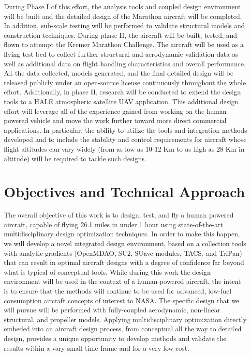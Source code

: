 \documentclass[]{aiaa-tc}
\begin{document}
    During Phase I of this effort, the analysis tools and coupled design environment will be built and 
    the detailed design of the Marathon aircraft will be completed. In addition, sub-scale testing will be 
    performed to validate structural models and construction techniques. During phase II, the aircraft will be built, 
    tested, and flown to attempt the Kremer Marathon Challenge. The aircraft will be used as a flying 
    test bed to collect further structural and aerodynamic validation data as well as additional data on 
    flight handling characteristics and overall performance. All the data collected, 
    models generated, and the final detailed design will be released publicly under an open-source license
    continuously throughout the whole effort. Additionally, in phase II, research will be conducted to extend the design tools to 
    a HALE atmospheric satellite UAV application. This additional design effort will leverage all of the experience 
    gained from working on the human powered vehicle and move the work further toward more direct commercial applications.
    In particular, the ability to utilize the tools and integration methods developed and to include the stability and
    control requirements for aircraft whose flight altitudes can vary widely (from as low as 10-12 Km to as high as 28 Km
    in altitude) will be required to tackle such designs.  


  \section{Objectives and Technical Approach}

    The overall objective of this work is to design, test, and fly a human powered aircraft, 
    capable of flying 26.1 miles in under 1 hour using state-of-the-art multidisciplinary 
    design optimization techniques. In order to make this happen, we will develop a novel integrated 
    design environment, based on a collection tools with analytic gradients (OpenMDAO, SU2, SUave 
    modules, TACS, and TriPan) that can result in optimal aircraft designs with a degree of confidence far beyond 
    what is typical of conceptual tools. While during this work the design environment will be used in the 
    context of a human-powered aircraft,  the intent is to ensure that the methods will continue to be used 
    for advanced, low-fuel consumption aircraft concepts of interest to NASA.  The specific design that we will 
    pursue will be performed with fully-coupled aerodynamic, non-linear structural, and propeller models. Applying 
    multidisciplinary optimization directly embeded into an aircraft design process, from conceptual all the 
    way to detailed design, provides a unique opportunity to develop methods and validate
    the results within a vary small time frame and for a very low cost. 
\end{document}
